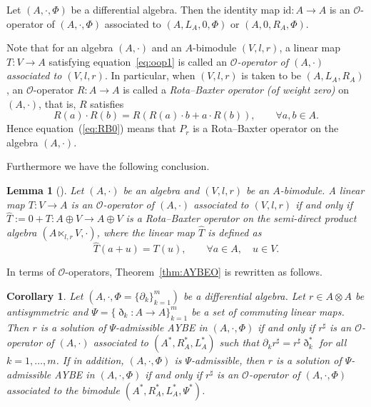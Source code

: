 \documentclass[10pt,a4paper]{amsart}
\numberwithin{equation}{section}
\newtheorem{Corollary}[Theorem]{Corollary}
\newtheorem{Lemma}[Theorem]{Lemma}
\newcommand{\id}{\mathrm{id}}
\begin{document}
\begin{Example}\label{example:o_operator}
 Let $(A, \cdot, \Phi)$ be a differential algebra.
 Then the identity map $\id\colon A \to A$ is an $\mathcal{O}$-operator of $(A, \cdot, \Phi)$ associated to $(A, L_A, 0, \Phi)$ or $(A, 0, R_A, \Phi)$.
\end{Example}

Note \cite{BaiDouble} that for an algebra $(A,\cdot)$ and an $A$-bimodule $(V, l, r)$, a linear map $T\colon V \to A$ satisfying equation~\eqref{eq:oop1} is called an \textit{$\mathcal{O}$-operator of $(A, \cdot)$ associated to $(V, l, r)$}.
In particular, when $(V,l,r)$ is taken to be $(A, L_A, R_A)$, an $\mathcal O$-operator $R\colon A \to A$ is called a \textit{Rota--Baxter operator (of weight zero)} on $(A, \cdot)$, that is, $R$ satisfies
\begin{equation*}
	R(a) \cdot R(b) = R(R(a) \cdot b + a \cdot R(b)), \qquad \forall a, b \in A.
\end{equation*}
Hence equation~(\ref{eq:RB0}) means that $P_r$ is a Rota--Baxter operator on the algebra $(A,\cdot)$.

Furthermore we have the following conclusion.
\begin{Lemma}[\cite{BGN0}]\label{lem:o2r}
	Let $(A, \cdot)$ be an algebra and $(V, l, r)$ be an $A$-bimodule.
	A linear map $T\colon V \to A$ is an $\mathcal{O}$-operator of $(A, \cdot)$ associated to $(V, l, r)$ if and only if $\hat T:=0 + T\colon A \oplus V \to A \oplus V$ is a Rota--Baxter operator on the semi-direct product algebra $(A \ltimes_{l, r} V, \cdot)$,
	where the linear map $\hat T$ is defined as
	\begin{equation}
		\hat T(a+u)=T(u),\qquad \forall a\in A,\quad u\in V. \label{eq:hatT}
	\end{equation}
\end{Lemma}

In terms of $\mathcal{O}$-operators, Theorem~\ref{thm:AYBEO} is rewritten as follows.
\begin{Corollary}\label{cor:aybe_o}
 Let $(A, \cdot, \Phi = \{\partial_k\}_{k=1}^m)$ be a differential algebra.
 Let $r \in A \otimes A$ be antisymmetric and
 $\Psi = \{\eth_k\colon A \to A\}_{k=1}^m$ be a set of commuting linear maps.
 Then $r$ is a solution of $\Psi$-admissible AYBE in $(A, \cdot, \Phi)$ if and only if
 $r^\sharp$ is an
	$\mathcal{O}$-operator of $(A, \cdot)$ associated to $(A^*, R_A^*, L_A^*)$ such that $\partial_k r^\sharp = r^\sharp \eth_k^*$ for all $k=1, \dots, m$.
 If in addition, $(A, \cdot, \Phi)$ is $\Psi$-admissible,
 then $r$ is a solution of $\Psi$-admissible AYBE in $(A, \cdot, \Phi)$ if and only if $r^\sharp$ is an $\mathcal{O}$-operator of $(A, \cdot, \Phi)$ associated to the bimodule $(A^*, R_A^*, L_A^*, \Psi^*)$.
\end{Corollary}
\end{document}
